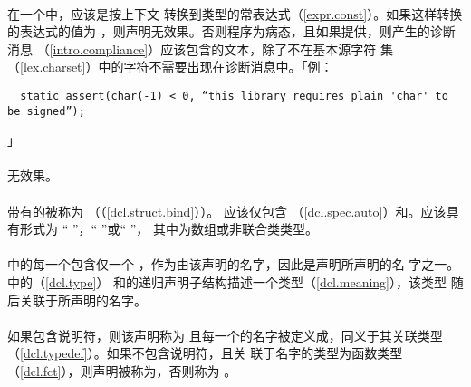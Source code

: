\paragraph{}
在一个中，应该是按上下文
转换到类型的常表达式（\ref{expr.const}）。如果这样转换的表达式的值为
，则声明无效果。否则程序为病态，且如果提供，则产生的诊断消息
（\ref{intro.compliance}）应该包含的文本，除了不在基本源字符
集（\ref{lex.charset}）中的字符不需要出现在诊断消息中。「例：
\begin{lstlisting}
  static_assert(char(-1) < 0, “this library requires plain 'char' to be signed”);
\end{lstlisting}」

\paragraph{}
无效果。

\paragraph{}
带有的被称为
（（\ref{dcl.struct.bind}））。
应该仅包含 
（\ref{dcl.spec.auto}）和。应该具有形式为
``\tm{=} ''，``\tm{\{} 
\tm{\}}''或``\tm{(}  \tm{)}''，
其中为数组或非联合类类型。

\paragraph{}
中的每一个包含仅一个
，作为由该声明的名字，因此是声明所声明的名
字之一。中的（\ref{dcl.type}）
和的递归声明子结构描述一个类型（\ref{dcl.meaning}），该类型
随后关联于所声明的名字。

\paragraph{}
如果包含说明符，则该声明称为
且每一个的名字被定义成，同义于其关联类型
（\ref{dcl.typedef}）。如果不包含说明符，且关
联于名字的类型为函数类型（\ref{dcl.fct}），则声明被称为，否则称为
。

